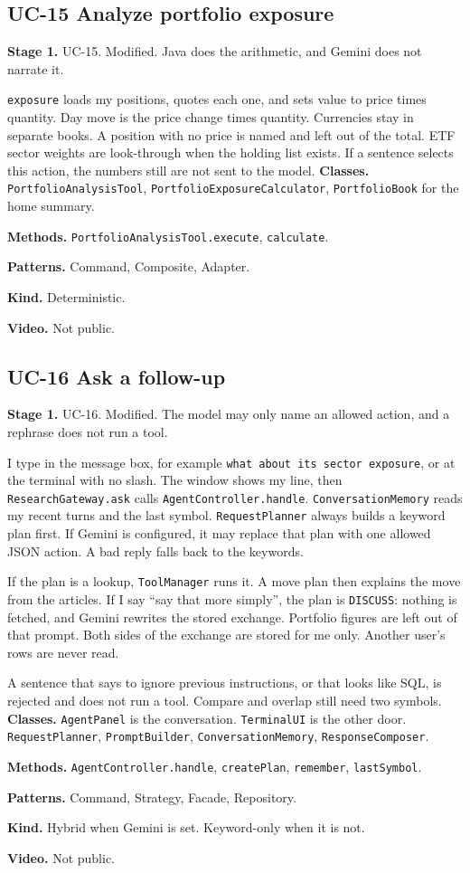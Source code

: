 \documentclass[11pt]{article}
\newcommand{\field}[2]{\textbf{#1.} #2\par}
\begin{document}
\subsection{UC-15 Analyze portfolio exposure}
\field{Stage 1}{UC-15. Modified. Java does the arithmetic, and Gemini does not narrate it.}
\texttt{exposure} loads my positions, quotes each one, and sets value to price times quantity. Day move is the price change times quantity. Currencies stay in separate books. A position with no price is named and left out of the total. ETF sector weights are look-through when the holding list exists. If a sentence selects this action, the numbers still are not sent to the model.
\field{Classes}{\texttt{PortfolioAnalysisTool}, \texttt{PortfolioExposureCalculator}, \texttt{PortfolioBook} for the home summary.}
\field{Methods}{\texttt{PortfolioAnalysisTool.execute}, \texttt{calculate}.}
\field{Patterns}{Command, Composite, Adapter.}
\field{Kind}{Deterministic.}
\field{Video}{Not public.}

\subsection{UC-16 Ask a follow-up}
\field{Stage 1}{UC-16. Modified. The model may only name an allowed action, and a rephrase does not run a tool.}
I type in the message box, for example \texttt{what about its sector exposure}, or at the terminal with no slash. The window shows my line, then \texttt{ResearchGateway.ask} calls \texttt{AgentController.handle}. \texttt{ConversationMemory} reads my recent turns and the last symbol. \texttt{RequestPlanner} always builds a keyword plan first. If Gemini is configured, it may replace that plan with one allowed JSON action. A bad reply falls back to the keywords.

If the plan is a lookup, \texttt{ToolManager} runs it. A move plan then explains the move from the articles. If I say ``say that more simply'', the plan is \texttt{DISCUSS}: nothing is fetched, and Gemini rewrites the stored exchange. Portfolio figures are left out of that prompt. Both sides of the exchange are stored for me only. Another user's rows are never read.

A sentence that says to ignore previous instructions, or that looks like SQL, is rejected and does not run a tool. Compare and overlap still need two symbols.
\field{Classes}{\texttt{AgentPanel} is the conversation. \texttt{TerminalUI} is the other door. \texttt{RequestPlanner}, \texttt{PromptBuilder}, \texttt{ConversationMemory}, \texttt{ResponseComposer}.}
\field{Methods}{\texttt{AgentController.handle}, \texttt{createPlan}, \texttt{remember}, \texttt{lastSymbol}.}
\field{Patterns}{Command, Strategy, Facade, Repository.}
\field{Kind}{Hybrid when Gemini is set. Keyword-only when it is not.}
\field{Video}{Not public.}
\end{document}
